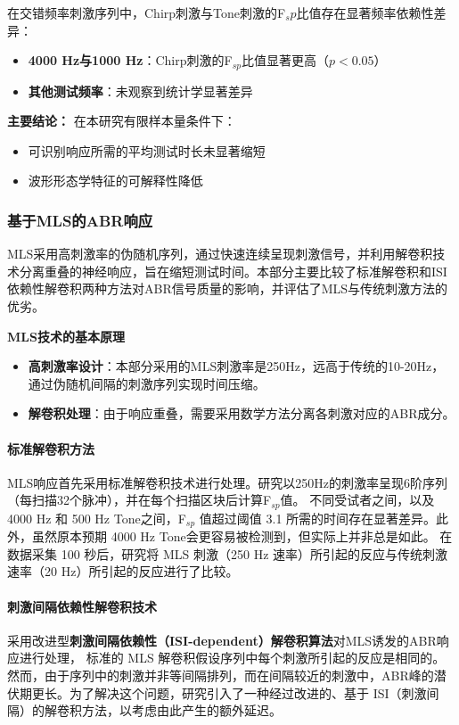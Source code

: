 在交错频率刺激序列中，Chirp刺激与Tone刺激的F{$_sp$}比值存在显著频率依赖性差异：

\begin{itemize}
\item \textbf{4000 Hz与1000 Hz}：Chirp刺激的F$_{sp}$比值显著更高（$p<0.05$）
\item \textbf{其他测试频率}：未观察到统计学显著差异
\end{itemize}

\textbf{主要结论：}
在本研究有限样本量条件下：

\begin{itemize}
\item 可识别响应所需的平均测试时长未显著缩短
\item 波形形态学特征的可解释性降低
\end{itemize}

\subsubsection{基于MLS的ABR响应}
MLS采用高刺激率的伪随机序列，通过快速连续呈现刺激信号，并利用解卷积技术分离重叠的神经响应，旨在缩短测试时间。本部分主要比较了标准解卷积和ISI依赖性解卷积两种方法对ABR信号质量的影响，并评估了MLS与传统刺激方法的优劣。

\textbf{MLS技术的基本原理}
\begin{itemize}
\item \textbf{高刺激率设计}：本部分采用的MLS刺激率是250Hz，远高于传统的10-20Hz，通过伪随机间隔的刺激序列实现时间压缩。
\item \textbf{解卷积处理}：由于响应重叠，需要采用数学方法分离各刺激对应的ABR成分。
\end{itemize}
\paragraph{标准解卷积方法}
MLS响应首先采用标准解卷积技术进行处理。研究以250Hz的刺激率呈现6阶序列（每扫描32个脉冲），并在每个扫描区块后计算F$_{sp}$值。
不同受试者之间，以及 4000 Hz 和 500 Hz Tone之间，F$_{sp}$ 值超过阈值 3.1 所需的时间存在显著差异。此外，虽然原本预期 4000 Hz Tone会更容易被检测到，但实际上并非总是如此。
在数据采集 100 秒后，研究将 MLS 刺激（250 Hz 速率）所引起的反应与传统刺激速率（20 Hz）所引起的反应进行了比较。


\paragraph{刺激间隔依赖性解卷积技术}
采用改进型\textbf{刺激间隔依赖性（ISI-dependent）解卷积算法}对MLS诱发的ABR响应进行处理，
标准的 MLS 解卷积假设序列中每个刺激所引起的反应是相同的。然而，由于序列中的刺激并非等间隔排列，而在间隔较近的刺激中，ABR峰的潜伏期更长。为了解决这个问题，研究引入了一种经过改进的、基于 ISI（刺激间隔）的解卷积方法，以考虑由此产生的额外延迟。

